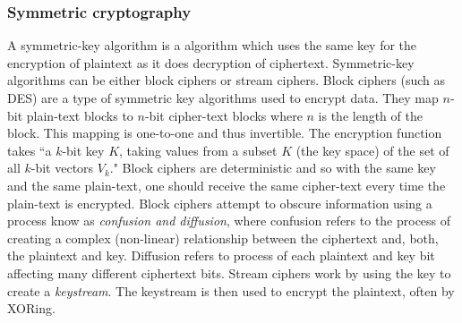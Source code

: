 \documentclass[12pt, titlepage]{article}
\begin{document}
\subsubsection*{Symmetric cryptography}
A symmetric-key algorithm is a algorithm which uses the same key for the encryption of plaintext as it does decryption of ciphertext. Symmetric-key algorithms can be either block ciphers or stream ciphers. Block ciphers (such as DES) are a type of symmetric key algorithms used to encrypt data. They map $n$-bit plain-text blocks to $n$-bit cipher-text blocks where $n$ is the length of the block. This mapping is one-to-one and thus invertible. The encryption function takes ``a $k$-bit key $K$, taking values from a subset $K$ (the key space) of the set of all $k$-bit vectors $V_{k}$." \cite{blockCiphers} Block ciphers are deterministic and so with the same key and the same plain-text, one should receive the same cipher-text every time the plain-text is encrypted.
\newline \indent Block ciphers attempt to obscure information using a process know as \textit{confusion and diffusion}, where confusion refers to the process of creating a complex (non-linear) relationship between the ciphertext and, both, the plaintext and key. Diffusion refers to process of each plaintext and key bit affecting many different ciphertext bits.
\newline \indent Stream ciphers work by using the key to create a \textit{keystream}. The keystream is then used to encrypt the plaintext, often by XORing.
\end{document}
